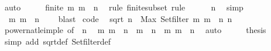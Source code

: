 \begin{isabellebody}
\ auto\isanewline
\ \ \isamarkupfalse%
\ \isamarkupfalse%
\ {\isachardoublequoteopen}finite\ {\isacharbraceleft}m{\isachardot}\ m\ {\isasymle}\ n{\isacharbraceright}{\isachardoublequoteclose}\ \isamarkupfalse%
\ {\isacharparenleft}rule\ finite{\isacharunderscore}subset{\isacharparenright}\ rule\isanewline
\ \ \isamarkupfalse%
\ {\isachardoublequoteopen}{}\ {\isasymle}\ n{\isachardoublequoteclose}\ \isamarkupfalse%
\ simp\isanewline
\ \ \isamarkupfalse%
\ \isamarkupfalse%
\ {\isacharasterisk}{\isacharcolon}\ {\isachardoublequoteopen}{\isacharbraceleft}m{\isachardot}\ m\ {\isasymle}\ n{\isacharbraceright}\ {\isasymnoteq}\ {\isacharbraceleft}{\isacharbraceright}{\isachardoublequoteclose}\ \isamarkupfalse%
\ blast\isanewline
{}\isamarkupfalse%
%
\endisatagproof
{\isafoldproof}%
%
\isadelimproof
\isanewline
%
\endisadelimproof
\isanewline
{}\isamarkupfalse%
\ {\isacharbrackleft}code{\isacharbrackright}{\isacharcolon}\isanewline
\ \ {\isachardoublequoteopen}sqrt\ n\ {\isacharequal}\ Max\ {\isacharparenleft}Set{\isachardot}filter\ {\isacharparenleft}{\isasymlambda}m{\isachardot}\ m\ {\isasymle}\ n{\isacharparenright}\ {\isacharbraceleft}{}{\isachardot}{\isachardot}n{\isacharbraceright}{\isacharparenright}{\isachardoublequoteclose}\isanewline
%
\isadelimproof
%
\endisadelimproof
%
\isatagproof
{}\isamarkupfalse%
\ {\isacharminus}\isanewline
\ \ \isamarkupfalse%
\ power{}{\isacharunderscore}nat{\isacharunderscore}le{\isacharunderscore}imp{\isacharunderscore}le\ {\isacharbrackleft}of\ {\isacharunderscore}\ n{\isacharbrackright}\ \isamarkupfalse%
\ {\isachardoublequoteopen}{\isacharbraceleft}m{\isachardot}\ m\ {\isasymle}\ n\ {\isasymand}\ m\ {\isasymle}\ n{\isacharbraceright}\ {\isacharequal}\ {\isacharbraceleft}m{\isachardot}\ m\ {\isasymle}\ n{\isacharbraceright}{\isachardoublequoteclose}\ \isamarkupfalse%
\ auto\isanewline
\ \ \isamarkupfalse%
\ \isamarkupfalse%
\ {\isacharquery}thesis\ \isamarkupfalse%
\ {\isacharparenleft}simp\ add{\isacharcolon}\ sqrt{\isacharunderscore}def\ Set{\isachardot}filter{\isacharunderscore}def{\isacharparenright}\isanewline
{}\isamarkupfalse%
%
\endisatagproof

\end{isabellebody}
